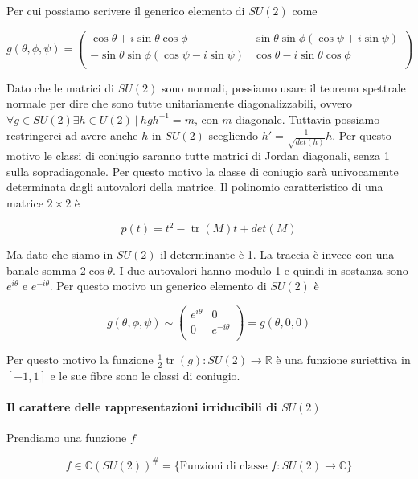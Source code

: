 \documentclass[11pt]{article}
\theoremstyle{plain}
\theoremstyle{definition}
\theoremstyle{remark}
\newcommand{\C}{\mathbb{C}}
\newcommand{\R}{\mathbb{R}}
\DeclareMathOperator{\tr}{tr}
\begin{document}
 Per cui possiamo scrivere il generico elemento di $SU(2)$ come

 \[
 g(\theta, \phi, \psi) = 
 \left(
 \begin{array}{cc}
   \cos\theta + i \sin\theta \cos\phi & \sin\theta\sin\phi( \cos\psi + i \sin\psi) \\
   -\sin\theta\sin\phi(\cos\psi - i \sin\psi) & \cos\theta - i \sin\theta\cos\phi  \\

 \end{array}
 \right)
 \]
 

 Dato che le matrici di $SU(2)$ sono normali, possiamo usare il teorema spettrale normale per dire che sono tutte unitariamente diagonalizzabili, ovvero $\forall g \in SU(2) \exists h \in U(2) \  | \ hgh^{-1} = m$, con $m$ diagonale. Tuttavia possiamo restringerci ad avere anche $h$ in $SU(2)$ scegliendo $h' = \frac{1}{\sqrt{det(h)}} h$. Per questo motivo le classi di coniugio saranno tutte matrici di Jordan diagonali, senza 1 sulla sopradiagonale. Per questo motivo la classe di coniugio sarà univocamente determinata dagli autovalori della matrice. Il polinomio caratteristico di una matrice $2\times 2$ è

 \[ p(t) = t^2 - \tr(M) t + det(M) \]

 Ma dato che siamo in $SU(2)$ il determinante è 1. La traccia è invece con una banale somma $2\cos\theta$. I due autovalori hanno modulo 1 e quindi in sostanza sono $e^{i\theta}$ e $e^{-i\theta}$. Per questo motivo un generico elemento di $SU(2)$ è


 \[
 g(\theta, \phi, \psi) \sim \left(
 \begin{array}{cc}
   e^{i\theta} & 0 \\
   0 & e^{-i\theta} \\
 \end{array}
 \right) = g(\theta, 0 , 0)
 \]




 Per questo motivo la funzione $\frac{1}{2} \tr(g) : SU(2) \to \R$ è una funzione suriettiva in $[-1,1]$ e le sue fibre sono le classi di coniugio.

 \paragraph{Il carattere delle rappresentazioni irriducibili di $SU(2)$}


 Prendiamo una funzione $f$

 \[ f \in \C(SU(2)) ^\# = \{ \text{Funzioni di classe } f: SU(2) \to \C  \} \]
\end{document}
